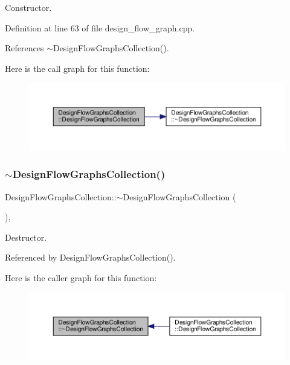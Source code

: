 Constructor. 



Definition at line 63 of file design\+\_\+flow\+\_\+graph.\+cpp.



References $\sim$\+Design\+Flow\+Graphs\+Collection().

Here is the call graph for this function\+:
\nopagebreak
\begin{figure}[H]
\begin{center}
\leavevmode
\includegraphics[width=350pt]{d8/dcb/classDesignFlowGraphsCollection_a8a9fa3c0c234c85ce301233af1bb9c8d_cgraph}
\end{center}
\end{figure}
\mbox{\label{classDesignFlowGraphsCollection_adc5a533a4e858c61ba53163c23a368a2}} 
\subsubsection{\texorpdfstring{$\sim$\+Design\+Flow\+Graphs\+Collection()}{~DesignFlowGraphsCollection()}}
{\footnotesize\ttfamily Design\+Flow\+Graphs\+Collection\+::$\sim$\+Design\+Flow\+Graphs\+Collection (\begin{DoxyParamCaption}{ }\end{DoxyParamCaption})\hspace{0.3cm}{\ttfamily [override]}, {\ttfamily [default]}}



Destructor. 



Referenced by Design\+Flow\+Graphs\+Collection().

Here is the caller graph for this function\+:
\nopagebreak
\begin{figure}[H]
\begin{center}
\leavevmode
\includegraphics[width=350pt]{d8/dcb/classDesignFlowGraphsCollection_adc5a533a4e858c61ba53163c23a368a2_icgraph}
\end{center}
\end{figure}


